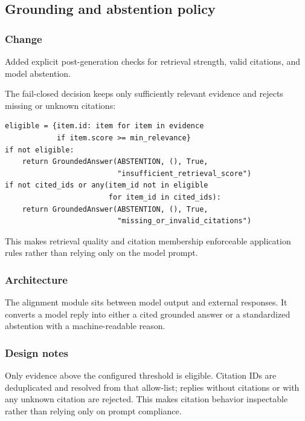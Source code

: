 
\subsection{Grounding and abstention policy}


\subsubsection{Change}

Added explicit post-generation checks for retrieval strength, valid citations, and model abstention.

The fail-closed decision keeps only sufficiently relevant evidence and rejects missing or unknown citations:

\begin{verbatim}
eligible = {item.id: item for item in evidence
            if item.score >= min_relevance}
if not eligible:
    return GroundedAnswer(ABSTENTION, (), True,
                          "insufficient_retrieval_score")
if not cited_ids or any(item_id not in eligible
                        for item_id in cited_ids):
    return GroundedAnswer(ABSTENTION, (), True,
                          "missing_or_invalid_citations")
\end{verbatim}

This makes retrieval quality and citation membership enforceable application rules rather than relying only on the model prompt.

\subsubsection{Architecture}

The alignment module sits between model output and external responses. It converts a model reply into either a cited grounded answer or a standardized abstention with a machine-readable reason.

\subsubsection{Design notes}

Only evidence above the configured threshold is eligible. Citation IDs are deduplicated and resolved from that allow-list; replies without citations or with any unknown citation are rejected. This makes citation behavior inspectable rather than relying only on prompt compliance.

